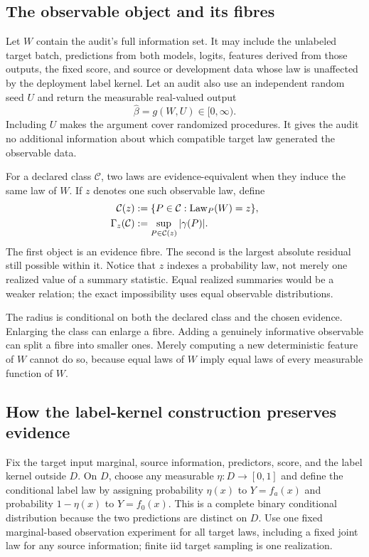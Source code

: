 \subsection{The observable object and its fibres}
\label{fr:subsec-fibre-definition}

Let $W$ contain the audit's full information set.  It may include the unlabeled target batch,
predictions from both models, logits, features derived from those outputs, the fixed score, and
source or development data whose law is unaffected by the deployment label kernel.  Let an audit
also use an independent random seed $U$ and return the measurable real-valued output
\begin{equation}
  \widehat\beta=g(W,U)\in[0,\infty).
  \label{fr:eq-randomized-audit}
\end{equation}
Including $U$ makes the argument cover randomized procedures.  It gives the audit no additional
information about which compatible target law generated the observable data.

For a declared class $\mathcal C$, two laws are evidence-equivalent when they induce the same law
of $W$.  If $z$ denotes one such observable law, define
\begin{align}
  \mathcal C(z)
    &:=\{P\in\mathcal C:\mathrm{Law}_P(W)=z\}, \\
  \Gamma_z(\mathcal C)
    &:=\sup_{P\in\mathcal C(z)}|\gamma(P)|.
  \label{fr:eq-fibre-radius}
\end{align}
The first object is an evidence fibre.  The second is the largest absolute residual still possible
within it.  Notice that $z$ indexes a probability law, not merely one realized value of a summary
statistic.  Equal realized summaries would be a weaker relation; the exact impossibility uses equal
observable distributions.

The radius is conditional on both the declared class and the chosen evidence.  Enlarging the class
can enlarge a fibre.  Adding a genuinely informative observable can split a fibre into smaller
ones.  Merely computing a new deterministic feature of $W$ cannot do so, because equal laws of $W$
imply equal laws of every measurable function of $W$.

\subsection{How the label-kernel construction preserves evidence}
\label{fr:subsec-kernel-construction}

Fix the target input marginal, source information, predictors, score, and the label kernel outside
$D$.  On $D$, choose any measurable $\eta:D\to[0,1]$ and define the conditional label law by
assigning probability $\eta(x)$ to $Y=f_a(x)$ and probability $1-\eta(x)$ to $Y=f_0(x)$.  This is a
complete binary conditional distribution because the two predictions are distinct on $D$.
Use one fixed marginal-based observation experiment for all target laws, including a fixed joint
law for any source information; finite iid target sampling is one realization.


